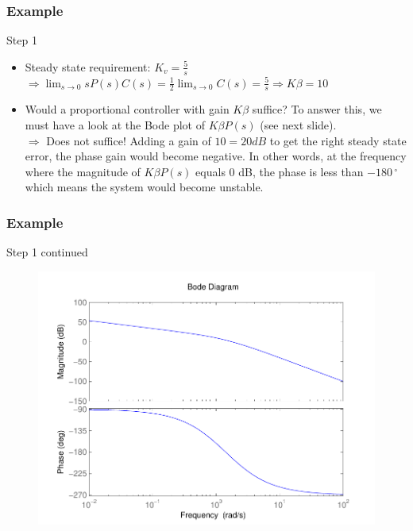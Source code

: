 \begin{frame}
\frametitle{Example}
\begin{block}{Step 1}
	\begin{itemize}
	\item Steady state requirement: $K_v = \frac{5}{s}$ \\
	$\Rightarrow \lim_{s \to 0} sP(s)C(s) = \frac{1}{2}\lim_{s \to 0} C(s) = \frac{5}{s} \Rightarrow K\beta = 10$
	\item Would a proportional controller with gain $K\beta$ suffice? To answer this, we must have a look at the Bode plot of $K\beta P(s)$ (see next slide). \\
	$\Rightarrow$ Does not suffice! Adding a gain of $10 = 20 dB$ to get the right steady state error, the phase gain would become negative. In other words, at the frequency where the magnitude of $K\beta P(s)$ equals 0 dB, the phase is less than $-180\,^{\circ}$ which means the system would become unstable.
	\end{itemize}
\end{block}
\end{frame}

\begin{frame}
\frametitle{Example}
\begin{block}{Step 1 continued}
\begin{figure}
	\centering
	\includegraphics[width=0.5
	\linewidth]{bodeexamplelagpropnotgood}
\end{figure}	
\end{block}
\end{frame}

